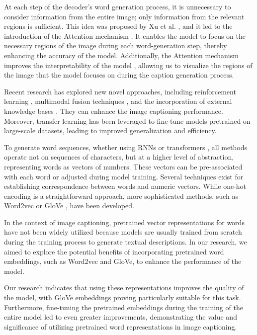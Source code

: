\documentclass[conference]{IEEEtran}
\begin{document}
At each step of the decoder's word generation process, it is unnecessary to consider information from the entire image; only information from the relevant regions is sufficient. This idea was proposed by Xu et al. \cite{xu2015show}, and it led to the introduction of the Attention mechanism \cite{niu2021review}. It enables the model to focus on the necessary regions of the image during each word-generation step, thereby enhancing the accuracy of the model. Additionally, the Attention mechanism improves the interpretability of the model \cite{gao2021interpretable}, allowing us to visualize the regions of the image that the model focuses on during the caption generation process.


Recent research has explored new novel approaches, including reinforcement learning \cite{kaelbling1996reinforcement}, multimodal fusion techniques \cite{zhao2019multimodal, kalimuthu2021fusion}, and the incorporation of external knowledge bases \cite{wu2017image}. They can enhance the image captioning performance. Moreover, transfer learning \cite{degadwala2021image} has been leveraged to fine-tune models pretrained on large-scale datasets, leading to improved generalization and efficiency.


To generate word sequences, whether using RNNs or transformers \cite{vaswani2017attention}, all methods operate not on sequences of characters, but at a higher level of abstraction, representing words as vectors of numbers. These vectors can be pre-associated with each word or adjusted during model training. Several techniques exist for establishing correspondence between words and numeric vectors. While one-hot encoding \cite{rodriguez2018beyond} is a straightforward approach, more sophisticated methods, %
such as Word2vec \cite{mikolov2013efficient} or GloVe \cite{pennington2014glove}, have been developed.


In the context of image captioning, pretrained vector representations for words have not been widely utilized because models are usually trained from scratch during the training process to generate textual descriptions. In our research, we aimed to explore the potential benefits of incorporating pretrained word embeddings, such as Word2vec and GloVe, to enhance the performance of the model.


Our research indicates that using these representations improves the quality of the model, with GloVe embeddings proving particularly suitable for this task. Furthermore, fine-tuning the pretrained embeddings during the training of the entire model led to even greater improvements, demonstrating the value and significance of utilizing pretrained word representations in image captioning.
\end{document}
